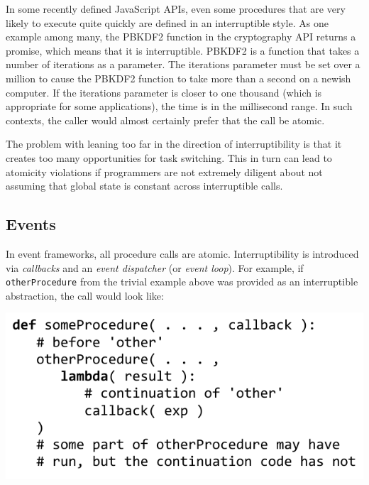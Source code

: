 \documentclass[preprint, 10pt, numbers]{sigplanconf}
\begin{document}
In some recently defined JavaScript APIs, even some procedures that are very likely to execute quite quickly are defined in an interruptible style.
As one example among many, the PBKDF2 function in the cryptography API returns a promise, which means that it is interruptible.
PBKDF2 is a function that takes a number of iterations as a parameter.
The iterations parameter must be set over a million to cause the PBKDF2 function to take more than a second on a newish computer.
If the iterations parameter is closer to one thousand (which is appropriate for some applications), the time is in the millisecond range.
In such contexts, the caller would almost certainly prefer that the call be atomic.

The problem with leaning too far in the direction of interruptibility is that it creates too many opportunities for task switching.
This in turn can lead to atomicity violations if programmers are not extremely diligent about not assuming that global state is constant across interruptible calls.

\subsection{Events}


In event frameworks, all procedure calls are atomic.
Interruptibility is introduced via \emph{callbacks} and an \emph{event dispatcher} (or \emph{event loop}).
For example, if \texttt{otherProcedure} from the trivial example above was provided as an interruptible abstraction, the call would look like:

\noindent
\includegraphics[scale=0.7]{trivial_call_event}
\end{document}
